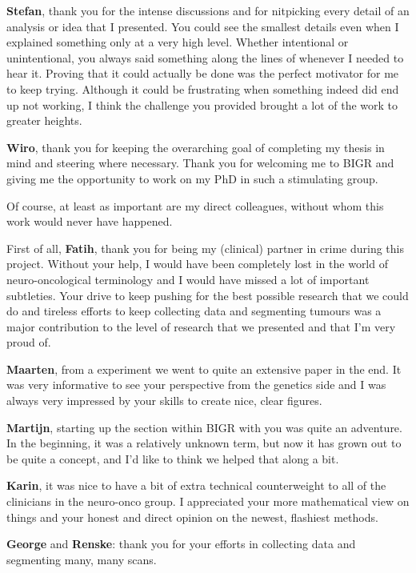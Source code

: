 \textbf{Stefan}, thank you for the intense discussions and for nitpicking every detail of an analysis or idea that I presented.
You could see the smallest details even when I explained something only at a very high level.
Whether intentional or unintentional, you always said something along the lines of  whenever I needed to hear it.
Proving that it could actually be done was the perfect motivator for me to keep trying.
Although it could be frustrating when something indeed did end up not working, I think the challenge you provided brought a lot of the work to greater heights.

\textbf{Wiro}, thank you for keeping the overarching goal of completing my thesis in mind and steering where necessary.
Thank you for welcoming me to BIGR and giving me the opportunity to work on my PhD in such a stimulating group.

Of course, at least as important are my direct colleagues, without whom this work would never have happened.

First of all, \textbf{Fatih}, thank you for being my (clinical) partner in crime during this project.
Without your help, I would have been completely lost in the world of neuro-oncological terminology and I would have missed a lot of important subtleties.
Your drive to keep pushing for the best possible research that we could do and tireless efforts to keep collecting data and segmenting tumours was a major contribution to the level of research that we presented and that I'm very proud of.

\textbf{Maarten}, from a  experiment we went to quite an extensive paper in the end.
It was very informative to see your perspective from the genetics side and I was always very impressed by your skills to create nice, clear figures.

\textbf{Martijn}, starting up the  section within BIGR with you was quite an adventure.
In the beginning, it was a relatively unknown term, but now it has grown out to be quite a concept, and I'd like to think we helped that along a bit.

\textbf{Karin}, it was nice to have a bit of extra technical counterweight to all of the clinicians in the neuro-onco group.
I appreciated your more mathematical view on things and your honest and direct opinion on the newest, flashiest methods.

\textbf{George} and \textbf{Renske}: thank you for your efforts in collecting data and segmenting many, many scans.

